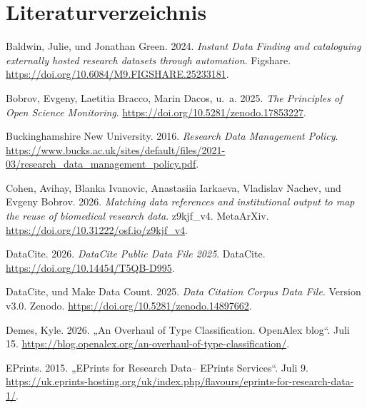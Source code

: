 \documentclass[
  ngerman,
  letterpaper,
  DIV=11]{scrreprt}
\newlength{\cslhangindent}
\newenvironment{CSLReferences}[2] %
 {\begin{list}{}{%
  \setlength{\itemindent}{0pt}
  \setlength{\leftmargin}{0pt}
  \setlength{\parsep}{0pt}
  \ifodd #1
   \setlength{\leftmargin}{\cslhangindent}
   \setlength{\itemindent}{-1\cslhangindent}
  \fi
  \setlength{\itemsep}{#2\baselineskip}}}
 {\end{list}}
\begin{document}
\chapter*{Literaturverzeichnis}\label{literaturverzeichnis}


\protect{}\label{refs}
\begin{CSLReferences}{1}{1}
Baldwin, Julie, und Jonathan Green. 2024. \emph{Instant Data Finding and
cataloguing externally hosted research datasets through automation}.
Figshare. \url{https://doi.org/10.6084/M9.FIGSHARE.25233181}.

Bobrov, Evgeny, Laetitia Bracco, Marin Dacos, u.~a. 2025. \emph{The
Principles of Open Science Monitoring}.
\url{https://doi.org/10.5281/zenodo.17853227}.

Buckinghamshire New University. 2016. \emph{Research Data Management
Policy}.
\url{https://www.bucks.ac.uk/sites/default/files/2021-03/research_data_management_policy.pdf}.

Cohen, Avihay, Blanka Ivanovic, Anastasiia Iarkaeva, Vladislav Nachev,
und Evgeny Bobrov. 2026. \emph{Matching data references and
institutional output to map the reuse of biomedical research data}.
z9kjf\_v4. {MetaArXiv}. \url{https://doi.org/10.31222/osf.io/z9kjf_v4}.

DataCite. 2026. \emph{{DataCite} Public Data File 2025}. {DataCite}.
\url{https://doi.org/10.14454/T5QB-D995}.

DataCite, und Make Data Count. 2025. \emph{Data Citation Corpus Data
File}. Version v3.0. Zenodo.
\url{https://doi.org/10.5281/zenodo.14897662}.

Demes, Kyle. 2026. {„An Overhaul of Type Classification. {OpenAlex}
blog``}. Juli 15.
\url{https://blog.openalex.org/an-overhaul-of-type-classification/}.

EPrints. 2015. {„{EPrints} for Research Data-- {EPrints} Services``}.
Juli 9.
\url{https://uk.eprints-hosting.org/uk/index.php/flavours/eprints-for-research-data-1/}.


\end{CSLReferences}
\end{document}
